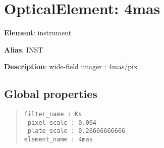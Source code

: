 

\section{OpticalElement: \textquotedbl{}4mas\textquotedbl{}%
  \label{opticalelement-4mas}%
}

\textbf{Element}: instrument

\textbf{Alias}: INST

\textbf{Description}: wide-field imager  : 4mas/pix


\subsection{Global properties%
  \label{global-properties}%
}

\begin{quote}
\begin{alltt}
\begin{lstlisting}[frame=single]
 filter_name : Ks
 pixel_scale : 0.004
 plate_scale : 0.26666666666
element_name : 4mas
\end{lstlisting}
\end{alltt}
\end{quote}
